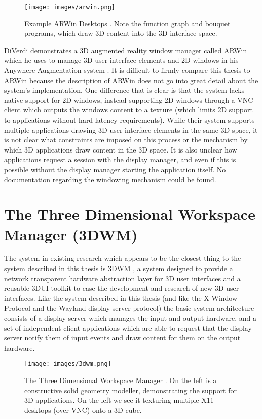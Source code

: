 \begin{figure}[ht!]
\centering
\texttt{[image: images/arwin.png]}
\caption{Example ARWin Desktops \protect\cite{anywhere-augmentation}\protect\cite{arwin}. Note the function graph and bouquet programs, which draw 3D content into the 3D interface space.}
\end{figure}

DiVerdi demonstrates a 3D augmented reality window manager called ARWin \cite{arwin} which he uses to manage 3D user interface elements and 2D windows in his Anywhere Augmentation system \cite{anywhere-augmentation}. It is difficult to firmly compare this thesis to ARWin because the description of ARWin does not go into great detail about the system's implementation. One difference that is clear is that the system lacks native support for 2D windows, instead supporting 2D windows through a VNC client which outputs the windows content to a texture (which limits 2D support to applications without hard latency requirements). While their system supports multiple applications drawing 3D user interface elements in the same 3D space, it is not clear what constraints are imposed on this process or the mechanism by which 3D applications draw content in the 3D space. It is also unclear how applications request a session with the display manager, and even if this is possible without the display manager starting the application itself. No documentation regarding the windowing mechanism could be found. 

\section{The Three Dimensional Workspace Manager (3DWM)}

The system in existing research which appears to be the closest thing to the system described in this thesis is 3DWM \cite{3dwm}, a system designed to provide a network transparent hardware abstraction layer for 3D user interfaces and a reusable 3DUI toolkit to ease the development and research of new 3D user interfaces. Like the system described in this thesis (and like the X Window Protocol and the Wayland display server protocol) the basic system architecture consists of a display server which manages the input and output hardware, and a set of independent client applications which are able to request that the display server notify them of input events and draw content for them on the output hardware. 

\begin{figure}[ht!]
\centering
\texttt{[image: images/3dwm.png]}
\caption{The Three Dimensional Workspace Manager \protect\cite{3dwm}. On the left is a constructive solid geometry modeller, demonstrating the support for 3D applications. On the left we see it texturing multiple X11 desktops (over VNC) onto a 3D cube.}
\end{figure}

